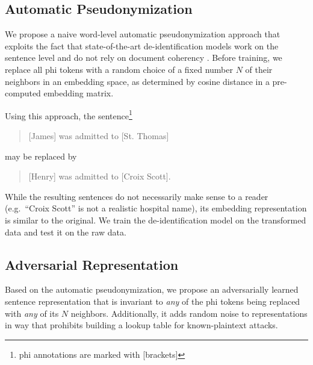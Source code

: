 \subsection{Automatic Pseudonymization}\label{sec:automatic-pseudonymization}
%
We propose a naive word-level automatic pseudonymization approach that exploits the fact that state-of-the-art de-identification models work on the sentence level and do not rely on document coherency \citep{liu2017identification,dernoncourt2017identification}.
%
Before training, we replace all \ac{phi} tokens with a random choice of a fixed number $N$ of their neighbors in an embedding space, as determined by cosine distance in a pre-computed embedding matrix.
%

%
Using this approach, the sentence\footnote{\ac{phi} annotations are marked with [brackets]}
%
\begin{quote}
    [James] was admitted to [St. Thomas]
\end{quote}
%
may be replaced by
\begin{quote}
    [Henry] was admitted to [Croix Scott].
\end{quote}
%
While the resulting sentences do not necessarily make sense to a reader (e.g.\ ``Croix Scott'' is not a realistic hospital name), its embedding representation is similar to the original.
%
We train the de-identification model on the transformed data and test it on the raw data.


\subsection{Adversarial Representation}\label{sec:adversarial-representation}
%
Based on the automatic pseudonymization, we propose an adversarially learned sentence representation that is invariant to \textit{any} of the \ac{phi} tokens being replaced with \textit{any} of its $N$ neighbors.
%
Additionally, it adds random noise to representations in way that prohibits building a lookup table for known-plaintext attacks.



